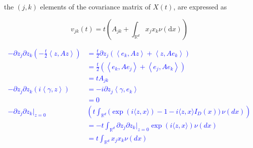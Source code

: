 \documentclass[a4paper,11pt]{article}
\begin{document}
the $(j, k)$ elements of the covariance matrix of $X(t)$, are expressed as


\begin{equation*}
    v_{j k}(t)=t\left(A_{j k}+\int_{\mathbb{R}^{d}} x_{j} x_{k} \nu(\mathrm{d} x)\right) \tag{25.8}
\end{equation*}

\textcolor{blue}{
    \begin{align*}
        -\partial z_{j} \partial z_{k} \left( -\frac{t}{2} \left< z,Az \right> \right) & =
        \frac{t}{2}\partial z_{j} \left( \left<e_{k}, Az \right> + \left<z , Ae_{k} \right>  \right)                                                                                                                                            \\
                                                                                       & = \frac{t}{2} \left( \left<e_{k}, Ae_{j} \right> + \left<e_{j} , Ae_{k} \right>  \right)                                                               \\
                                                                                       & = tA_{jk}                                                                                                                                              \\
        -\partial z_{j} \partial z_{k} \left(  i\left< \gamma,z \right> \right)        & = -i \partial z_{j} \left< \gamma, e_{k} \right>                                                                                                       \\
                                                                                       & = 0                                                                                                                                                    \\
        -\partial z_{j} \partial z_{k}|_{z=0}                                          & \left(t \int_{\mathbb{R}^{d}} \bigl( \operatorname{e x p} ( i \langle z, x \rangle)-1-i \langle z, x \rangle I_{D} ( x ) \bigr) \, \nu( d x )  \right) \\
                                                                                       & = -t\int_{\mathbb{R}^{d}}  \partial z_{j} \partial z_{k} |_{z=0}\operatorname{e x p} ( i \langle z, x \rangle) \nu( d x )                              \\
                                                                                       & = t\int_{\mathbb{R}^{d}} x_{j} x_{k} \nu( d x )
    \end{align*}
}
\end{document}
